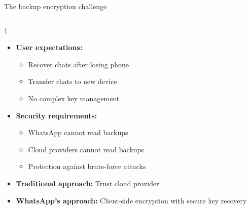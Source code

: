 \ifdefined\PRESENTATION\else\PassOptionsToClass{handout}{beamer}\fi\documentclass[aspectratio=169, lualatex]{beamer}
\begin{document}
\begin{frame}{The backup encryption challenge}
	\begin{columns}[c]
		\begin{column}{1\textwidth}
			\begin{itemize}
				\item \textbf{User expectations:}
				      \begin{itemize}
					      \item Recover chats after losing phone
					      \item Transfer chats to new device
					      \item No complex key management
				      \end{itemize}
				\item \textbf{Security requirements:}
				      \begin{itemize}
					      \item WhatsApp cannot read backups
					      \item Cloud providers cannot read backups
					      \item Protection against brute-force attacks
				      \end{itemize}
				\item \textbf{Traditional approach:} Trust cloud provider
				\item \textbf{WhatsApp's approach:} Client-side encryption with secure key recovery
			\end{itemize}
		\end{column}
	\end{columns}
\end{frame}
\end{document}
